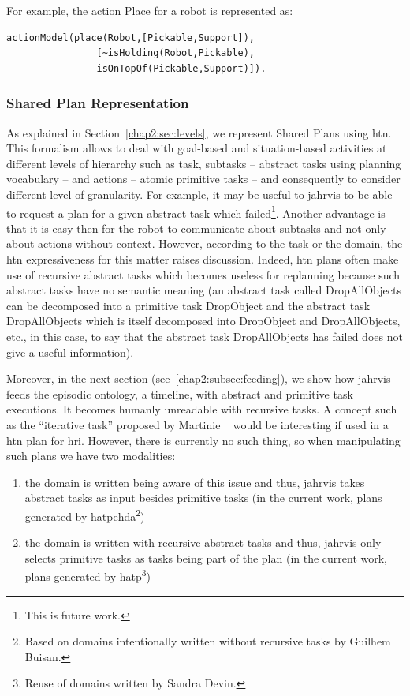 \documentclass[a4paper,11pt,twoside]{StyleThese}
\begin{document}
For example, the action Place for a robot is represented as:
\begin{lstlisting}[style=aslDef]
actionModel(place(Robot,[Pickable,Support]),
				[~isHolding(Robot,Pickable), 
				isOnTopOf(Pickable,Support)]).
\end{lstlisting}

\subsubsection{Shared Plan Representation}\label{chap2:subsubsec:shared_p_rep}
As explained in Section~\ref{chap2:sec:levels}, we represent Shared Plans using \acrfull{htn}. This formalism allows to deal with goal-based and situation-based activities at different levels of hierarchy such as task, subtasks -- abstract tasks using planning vocabulary -- and actions -- atomic primitive tasks -- and consequently to consider different level of granularity. For example, it may be useful to \acrshort{jahrvis} to be able to request a plan for a given abstract task which failed\footnote{This is future work.}. Another advantage is that it is easy then for the robot to communicate about subtasks and not only about actions without context. However, according to the task or the domain, the \acrshort{htn} expressiveness for this matter raises discussion. Indeed, \acrshort{htn} plans often make use of recursive abstract tasks which becomes useless for replanning because such abstract tasks have no semantic meaning (\eg an abstract task called DropAllObjects can be decomposed into a primitive task DropObject and the abstract task DropAllObjects which is itself decomposed into DropObject and DropAllObjects, etc., in this case, to say that the abstract task DropAllObjects has failed does not give a useful information). 

Moreover, in the next section (see~\ref{chap2:subsec:feeding}), we show how \acrshort{jahrvis} feeds the episodic ontology, a timeline, with abstract and primitive task executions. It becomes humanly unreadable with recursive tasks. A concept such as the ``iterative task'' proposed by Martinie \etal{}~\cite{martinie_2011_structuring} would be interesting if used in a \acrshort{htn} plan for \acrshort{hri}. However, there is currently no such thing, so when manipulating such plans we have two modalities:
\begin{enumerate}
	\item the domain is written being aware of this issue and thus, \acrshort{jahrvis} takes abstract tasks as input besides primitive tasks (\ie in the current work, plans generated by \acrshort{hatpehda}\footnote{Based on domains intentionally written without recursive tasks by Guilhem Buisan.})
	\item the domain is written with recursive abstract tasks and thus, \acrshort{jahrvis} only selects primitive tasks as tasks being part of the plan (\ie in the current work, plans generated by \acrshort{hatp}\footnote{Reuse of domains written by Sandra Devin.})
\end{enumerate}
\end{document}
